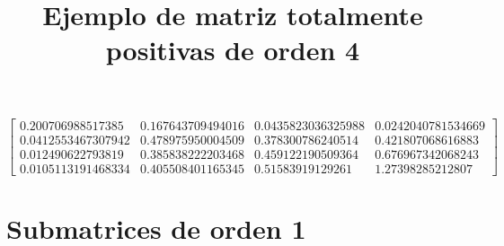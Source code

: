 \documentclass[12pt]{article}
\begin{document}
\title{Ejemplo de matriz totalmente positivas de orden 4}
\maketitle

$$\left[\begin{matrix}0.200706988517385 & 0.167643709494016 & 0.0435823036325988 & 0.0242040781534669\\0.0412553467307942 & 0.478975950004509 & 0.378300786240514 & 0.421807068616883\\0.012490622793819 & 0.385838222203468 & 0.459122190509364 & 0.676967342068243\\0.0105113191468334 & 0.405508401165345 & 0.51583919129261 & 1.27398285212807\end{matrix}\right]$$


\section*{Submatrices de orden 1}
\end{document}
